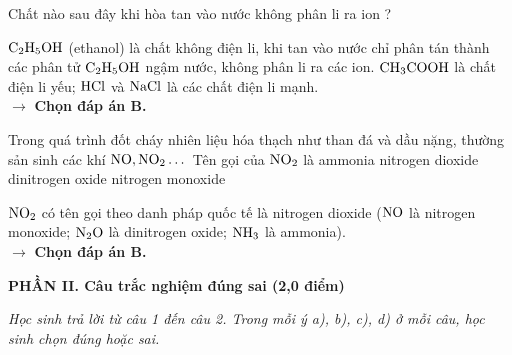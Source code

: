 \documentclass[11pt,a4paper]{article}
\begin{document}
\begin{ex}%
Chất nào sau đây khi hòa tan vào nước không phân li ra ion ?
\choice
{}
{\True {}}
{}
{}
\begin{loigiai}
$\ce{C2H5OH}$ (ethanol) là chất không điện li, khi tan vào nước chỉ phân tán thành các phân tử $\ce{C2H5OH}$ ngậm nước, không phân li ra các ion. $\ce{CH3COOH}$ là chất điện li yếu; $\ce{HCl}$ và $\ce{NaCl}$ là các chất điện li mạnh.\\
$\rightarrow$ \textbf{Chọn đáp án B.}
\end{loigiai}
\end{ex}


\begin{ex}%
Trong quá trình đốt cháy nhiên liệu hóa thạch như than đá và dầu nặng, thường sản sinh các khí $\ce{NO, NO2}\dots$ Tên gọi của $\ce{NO2}$ là
\choice
{ammonia}
{\True nitrogen dioxide}
{dinitrogen oxide}
{nitrogen monoxide}
\begin{loigiai}
$\ce{NO2}$ có tên gọi theo danh pháp quốc tế là nitrogen dioxide ($\ce{NO}$ là nitrogen monoxide; $\ce{N2O}$ là dinitrogen oxide; $\ce{NH3}$ là ammonia).\\
$\rightarrow$ \textbf{Chọn đáp án B.}
\end{loigiai}
\end{ex}


\vspace{6pt}
\noindent
\textbf{\large\color{mainGreen}PHẦN II. Câu trắc nghiệm đúng sai (2,0 điểm)}

\textit{Học sinh trả lời từ câu 1 đến câu 2. Trong mỗi ý a), b), c), d) ở mỗi câu, học sinh chọn đúng hoặc sai.}
\vspace{4pt}
\end{document}

